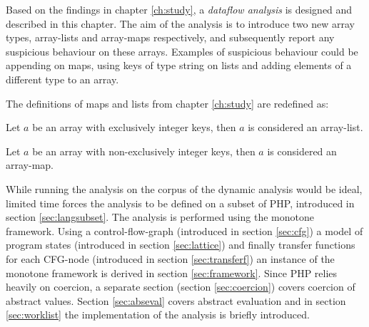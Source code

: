 Based on the findings in chapter \ref{ch:study}, a \emph{dataflow analysis} is designed and described in this chapter. The aim of the analysis is to introduce two new array types, array-lists and array-maps respectively, and subsequently report any suspicious behaviour on these arrays. Examples of suspicious behaviour could be appending on maps, using keys of type string on lists and adding elements of a different type to an array.

The definitions of maps and lists from chapter \ref{ch:study} are redefined as:

\begin{definition}
Let $a$ be an array with exclusively integer keys, then  $a$ is considered an array-list.
\end{definition}

\begin{definition}
Let $a$ be an array with non-exclusively integer keys, then $a$ is considered an array-map.
\end{definition}

While running the analysis on the corpus of the dynamic analysis would be ideal, limited time forces the analysis to be defined on a subset of PHP, introduced in section \ref{sec:langsubset}. The analysis is performed using the monotone framework. Using a control-flow-graph (introduced in section \ref{sec:cfg}) a model of program states (introduced in section \ref{sec:lattice}) and finally transfer functions for each CFG-node (introduced in section \ref{sec:transferf}) an instance of the monotone framework is derived in section \ref{sec:framework}. Since PHP relies heavily on coercion, a separate section (section \ref{sec:coercion}) covers coercion of abstract values. Section \ref{sec:abseval} covers abstract evaluation and in section \ref{sec:worklist} the implementation of the analysis is briefly introduced.
